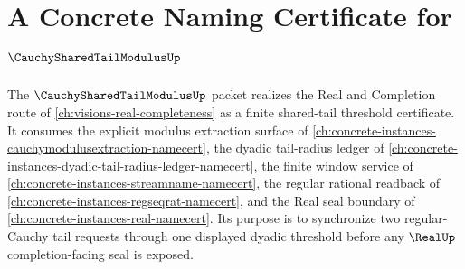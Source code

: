 \chapter{A Concrete Naming Certificate for $\CauchySharedTailModulusUp$}
\label{ch:concrete-instances-cauchy-shared-tail-modulus-namecert}

The $\CauchySharedTailModulusUp$ packet realizes the Real and Completion route of \autoref{ch:visions-real-completeness} as a finite shared-tail threshold certificate. It consumes the explicit modulus extraction surface of \autoref{ch:concrete-instances-cauchymodulusextraction-namecert}, the dyadic tail-radius ledger of \autoref{ch:concrete-instances-dyadic-tail-radius-ledger-namecert}, the finite window service of \autoref{ch:concrete-instances-streamname-namecert}, the regular rational readback of \autoref{ch:concrete-instances-regseqrat-namecert}, and the Real seal boundary of \autoref{ch:concrete-instances-real-namecert}. Its purpose is to synchronize two regular-Cauchy tail requests through one displayed dyadic threshold before any $\RealUp$ completion-facing seal is exposed.

